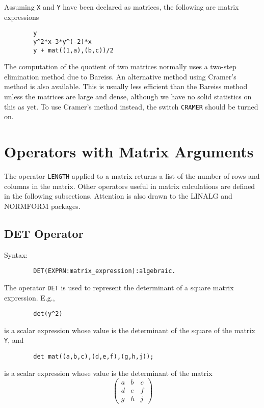 Assuming {\tt X} and {\tt Y} have been declared as matrices, the following
are matrix expressions
\begin{verbatim}
        y
        y^2*x-3*y^(-2)*x
        y + mat((1,a),(b,c))/2
\end{verbatim}
The computation of the quotient of two matrices normally uses a two-step
elimination method due to Bareiss.  An alternative method using Cramer's
method is also available.  This is usually less efficient than the Bareiss
method unless the matrices are large and dense, although we have no solid
statistics on this as yet.  To use Cramer's method instead, the switch
{\tt CRAMER} should be turned on.


\section{Operators with Matrix Arguments}

The operator {\tt LENGTH} applied to a matrix returns a
list of the number of rows and columns in the matrix.  Other operators
useful in matrix calculations are defined in the following subsections.
Attention is also drawn to the LINALG
 and NORMFORM
 packages.

\subsection{DET Operator}
\hypertarget{operator:DET}{}
Syntax:
\begin{verbatim}
        DET(EXPRN:matrix_expression):algebraic.
\end{verbatim}

The operator {\tt DET} is used to represent the determinant of a square
matrix expression.  E.g.,
\begin{verbatim}
        det(y^2)
\end{verbatim}
is a scalar expression whose value is the determinant of the square of the
matrix {\tt Y}, and
\begin{verbatim}
        det mat((a,b,c),(d,e,f),(g,h,j));
\end{verbatim}
is a scalar expression whose value is the determinant of the matrix
\[ \left( \begin{array}{lcr} a & b & c \\ d & e & f \\ g & h & j
\end{array} \right) \]

